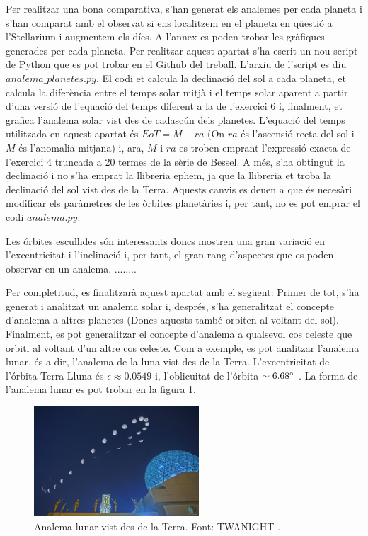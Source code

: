\documentclass[a4paper, 11pt]{article}
\begin{document}
\noindent Per realitzar una bona comparativa, s'han generat els analemes per cada planeta i s'han comparat amb el observat si ens localitzem en el planeta en qüestió a l'Stellarium i augmentem els díes. A l'annex es poden trobar les gràfiques generades per cada planeta. Per realitzar aquest apartat s'ha escrit un nou script de Python que es pot trobar en el Github del treball. L'arxiu de l'script es diu $analema\_planetes.py$. El codi et calcula la declinació del sol a cada planeta, et calcula la diferència entre el temps solar mitjà i el temps solar aparent a partir d'una versió de l'equació del temps diferent a la de l'exercici 6 i, finalment, et grafica l'analema solar vist des de cadascún dels planetes. L'equació del temps utilitzada en aquest apartat és $EoT = M - ra$ (On $ra$ és l'ascensió recta del sol i $M$ és l'anomalia mitjana) i, ara, $M$ i $ra$ es troben emprant l'expressió exacta de l'exercici 4 truncada a 20 termes de la sèrie de Bessel. A més, s'ha obtingut la declinació i no s'ha emprat la llibreria ephem, ja que la llibreria et troba la declinació del sol vist des de la Terra. Aquests canvis es deuen a que és necesàri modificar els paràmetres de les òrbites planetàries i, per tant, no es pot emprar el codi $analema.py$.

\vspace{2mm}

\noindent Les órbites escullides són interessants doncs mostren una gran variació en l'excentricitat i l'inclinació i, per tant, el gran rang d'aspectes que es poden observar en un analema. ........

\vspace{2mm}

\noindent Per completitud, es finalitzarà aquest apartat amb el següent: Primer de tot, s'ha generat i analitzat un analema solar i, després, s'ha generalitzat el concepte d'analema a altres planetes (Doncs aquests també orbiten al voltant del sol). Finalment, es pot generalitzar el concepte d'analema a qualsevol cos celeste que orbiti al voltant d'un altre cos celeste. Com a exemple, es pot analitzar l'analema lunar, és a dir, l'analema de la luna vist des de la Terra. L'excentricitat de l'órbita Terra-Lluna és $\epsilon \approx 0.0549$ i, l'oblicuitat de l'órbita $\sim 6.68 \degree$ \cite{LLUNA}. La forma de l'analema lunar es pot trobar en la figura \ref{fig:analema_luna}.

\begin{figure}[h!]
    \centering
    \includegraphics[width=0.55\textwidth]{images/analema_luna.jpg}
    \caption{Analema lunar vist des de la Terra. Font: TWANIGHT \cite{ANALEMA_MOON}.}
    \label{fig:analema_luna}
\end{figure}
\end{document}
